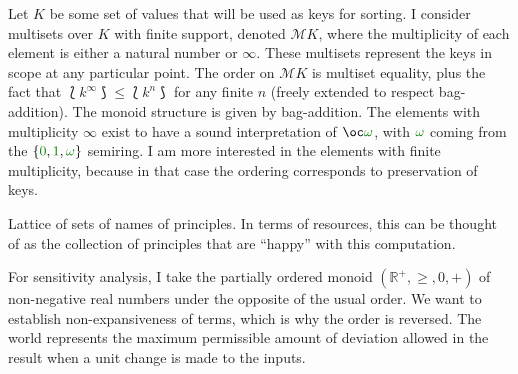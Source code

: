 \begin{example}\label{def:permutation-worlds}
  Let $K$ be some set of values that will be used as keys for sorting.
  I consider multisets over $K$ with finite support, denoted $\mathcal MK$,
  where the multiplicity of each element is either a natural number or $\infty$.
  These multisets represent the keys in scope at any particular point.
  The order on $\mathcal MK$ is multiset equality, plus the fact that
  $\lbag k^\infty \rbag \leq \lbag k^n \rbag$ for any finite $n$ (freely
  extended to respect bag-addition).
  The monoid structure is given by bag-addition.
  The elements with multiplicity $\infty$ exist to have a sound interpretation
  of $\oc\gr\omega$, with $\gr\omega$ coming from the
  $\{\gr0, \gr1, \gr\omega\}$ semiring.
  I am more interested in the elements with finite multiplicity, because in that
  case the ordering corresponds to preservation of keys.



\end{example}

\begin{example}\label{def:privacy-worlds}
  Lattice of sets of names of principles. In terms of resources, this
  can be thought of as the collection of principles that are ``happy''
  with this computation. 
\end{example}

\begin{example}[Distances]\label{def:sensitivity-worlds}
  For sensitivity analysis, I take the partially ordered monoid
  $(\mathbb R^+, \geq, 0, {+})$ of non-negative real numbers under the opposite
  of the usual order.
  We want to establish non-expansiveness of terms, which is why the order is
  reversed.
  The world represents the maximum permissible amount of deviation allowed in
  the result when a unit change is made to the inputs.
\end{example}


